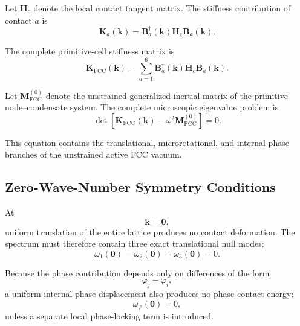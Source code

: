 Let $\mathbf{H}_{\mathrm{c}}$ denote the local contact tangent matrix. The stiffness contribution of contact $a$ is
\begin{equation}
    \mathbf{K}_a(\mathbf{k}) = \mathbf{B}_a^{\dagger}(\mathbf{k}) \mathbf{H}_{\mathrm{c}} \mathbf{B}_a(\mathbf{k}).
\end{equation}

The complete primitive-cell stiffness matrix is
\begin{equation}
    \boxed{ \mathbf{K}_{\mathrm{FCC}}(\mathbf{k}) = \sum_{a=1}^{6} \mathbf{B}_a^{\dagger}(\mathbf{k}) \mathbf{H}_{\mathrm{c}} \mathbf{B}_a(\mathbf{k}) }.
\end{equation}

Let $\mathbf{M}_{\mathrm{FCC}}^{(0)}$ denote the unstrained generalized inertial matrix of the primitive node--condensate system. The complete microscopic eigenvalue problem is
\begin{equation}
    \boxed{ \det \left[ \mathbf{K}_{\mathrm{FCC}}(\mathbf{k}) - \omega^2 \mathbf{M}_{\mathrm{FCC}}^{(0)} \right] = 0. }
\end{equation}

This equation contains the translational, microrotational, and internal-phase branches of the unstrained active FCC vacuum.

\subsection{Zero-Wave-Number Symmetry Conditions}

At
\begin{equation}
    \mathbf{k} = \mathbf{0},
\end{equation}
uniform translation of the entire lattice produces no contact deformation. The spectrum must therefore contain three exact translational null modes:
\begin{equation}
    \omega_1(\mathbf{0}) = \omega_2(\mathbf{0}) = \omega_3(\mathbf{0}) = 0.
\end{equation}

Because the phase contribution depends only on differences of the form
\begin{equation}
    \varphi_j - \varphi_i,
\end{equation}
a uniform internal-phase displacement also produces no phase-contact energy:
\begin{equation}
    \omega_{\varphi}(\mathbf{0}) = 0,
\end{equation}
unless a separate local phase-locking term is introduced.


